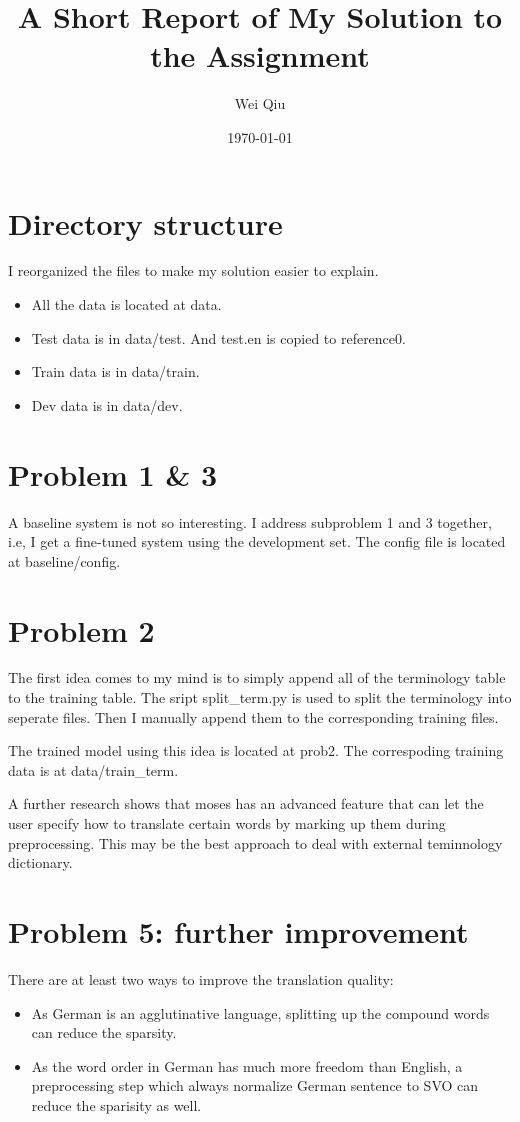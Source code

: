 \documentclass[a4paper]{article}
\title{A Short Report of My Solution to the Assignment}
\author{Wei Qiu}
\date{\today}
\begin{document}
\maketitle

\section{Directory structure}
I reorganized the files to make my solution easier to explain.
\begin{itemize}
    \item All the data is located at data.
    \item Test data is in data/test. And test.en is copied to reference0.
    \item Train data is in data/train. 
    \item Dev data is in data/dev.
\end{itemize}

\section{Problem 1 \& 3}

A baseline system is not so interesting.
I address subproblem 1 and 3 together, i.e, I get a fine-tuned system using the development set. 
The config file is located at baseline/config.

\section{Problem 2}
The first idea comes to my mind is to simply append all of the terminology table to the training table. The sript split_term.py is used to split the terminology into seperate files. Then I manually append them to the corresponding training files.

The trained model using this idea is located at prob2. The correspoding training data is at data/train\_term.

A further research shows that moses has an advanced feature that can let the user specify how to translate certain words by marking up them during preprocessing.
This may be the best approach to deal with external teminnology dictionary.




\section{Problem 5: further improvement}
There are at least two ways to improve the translation quality:
\begin{itemize}
    \item As German is an agglutinative language, splitting up the compound words can reduce the sparsity. 
    \item As the word order in German has much more freedom than English, a preprocessing step which always normalize German sentence to SVO can reduce the sparisity as well.

\end{itemize}
\end{document}
